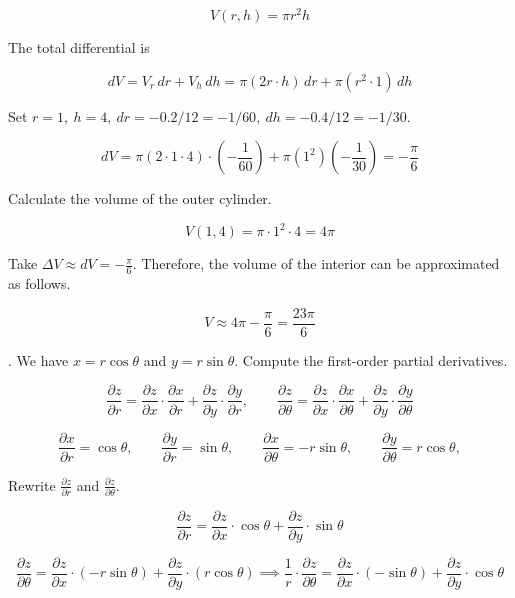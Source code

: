 \documentclass{article}
\begin{document}
\[V(r,h)=\pi r^2 h\]

\hfill

\noindent The total differential is

\[dV=V_r\,dr+V_h\,dh=\pi\left(2r\cdot h\right)\,dr+\pi\left(r^2\cdot 1\right)\,dh\]

\hfill

\noindent Set $r=1,\:h=4,\:dr=-0.2/12=-1/60,\:dh=-0.4/12=-1/30$.

\[dV=\pi\left(2\cdot1\cdot 4\right)\cdot\left(-\frac1{60}\right)+\pi\left(1^2\right)\left(-\frac1{30}\right)=-\frac\pi6\]

\hfill

\noindent Calculate the volume of the outer cylinder.

\[V(1,4)=\pi\cdot1^2\cdot4=4\pi\]

\hfill

\noindent Take $\displaystyle\Delta V\approx dV=-\frac\pi6$. Therefore, the volume of the interior can be approximated as follows.

\[\boxed{V\approx4\pi-\frac\pi6=\frac{23\pi}6}\]

\newpage

. We have $x=r\cos\theta$ and $y=r\sin\theta$. Compute the first-order partial derivatives.

\[\frac{\partial z}{\partial r}=\frac{\partial z}{\partial x}\cdot\frac{\partial x}{\partial r}+\frac{\partial z}{\partial y}\cdot\frac{\partial y}{\partial r},\qquad\frac{\partial z}{\partial \theta}=\frac{\partial z}{\partial x}\cdot\frac{\partial x}{\partial \theta}+\frac{\partial z}{\partial y}\cdot\frac{\partial y}{\partial \theta}\]

\hfill

\[\frac{\partial x}{\partial r}=\cos\theta,\qquad\frac{\partial y}{\partial r}=\sin\theta,\qquad\frac{\partial x}{\partial \theta}=-r\sin\theta,\qquad\frac{\partial y}{\partial\theta}=r\cos\theta,\]

\hfill

\noindent Rewrite $\displaystyle\frac{\partial z}{\partial r}$ and $\displaystyle\frac{\partial z}{\partial\theta}$.

\[\frac{\partial z}{\partial r}=\frac{\partial z}{\partial x}\cdot\cos\theta+\frac{\partial z}{\partial y}\cdot\sin\theta\]

\[\frac{\partial z}{\partial\theta}=\frac{\partial z}{\partial x}\cdot(-r\sin\theta)+\frac{\partial z}{\partial y}\cdot(r\cos\theta)\implies\frac1r\cdot\frac{\partial z}{\partial\theta}=\frac{\partial z}{\partial x}\cdot(-\sin\theta)+\frac{\partial z}{\partial y}\cdot\cos\theta\]
\end{document}
